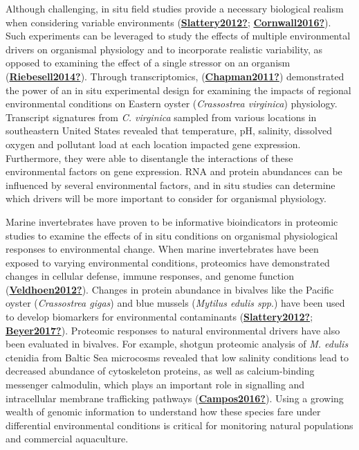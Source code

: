 \documentclass [11pt, proquest] {uwthesis}[2015/03/03]
\begin{document}
Although challenging, in situ field studies provide a necessary biological realism when considering variable environments (\protect\hyperlink{ref-Slattery2012}{\textbf{Slattery2012?}}; \protect\hyperlink{ref-Cornwall2016}{\textbf{Cornwall2016?}}). Such experiments can be leveraged to study the effects of multiple environmental drivers on organismal physiology and to incorporate realistic variability, as opposed to examining the effect of a single stressor on an organism (\protect\hyperlink{ref-Riebesell2014}{\textbf{Riebesell2014?}}). Through transcriptomics, (\protect\hyperlink{ref-Chapman2011}{\textbf{Chapman2011?}}) demonstrated the power of an in situ experimental design for examining the impacts of regional environmental conditions on Eastern oyster (\emph{Crassostrea virginica}) physiology. Transcript signatures from \emph{C. virginica} sampled from various locations in southeastern United States revealed that temperature, pH, salinity, dissolved oxygen and pollutant load at each location impacted gene expression. Furthermore, they were able to disentangle the interactions of these environmental factors on gene expression. RNA and protein abundances can be influenced by several environmental factors, and in situ studies can determine which drivers will be more important to consider for organismal physiology.

Marine invertebrates have proven to be informative bioindicators in proteomic studies to examine the effects of in situ conditions on organismal physiological responses to environmental change. When marine invertebrates have been exposed to varying environmental conditions, proteomics have demonstrated changes in cellular defense, immune responses, and genome function (\protect\hyperlink{ref-Veldhoen2012}{\textbf{Veldhoen2012?}}). Changes in protein abundance in bivalves like the Pacific oyster (\emph{Crassostrea gigas}) and blue mussels (\emph{Mytilus edulis spp}.) have been used to develop biomarkers for environmental contaminants (\protect\hyperlink{ref-Slattery2012}{\textbf{Slattery2012?}}; \protect\hyperlink{ref-Beyer2017}{\textbf{Beyer2017?}}). Proteomic responses to natural environmental drivers have also been evaluated in bivalves. For example, shotgun proteomic analysis of \emph{M. edulis} ctenidia from Baltic Sea microcosms revealed that low salinity conditions lead to decreased abundance of cytoskeleton proteins, as well as calcium-binding messenger calmodulin, which plays an important role in signalling and intracellular membrane trafficking pathways (\protect\hyperlink{ref-Campos2016}{\textbf{Campos2016?}}). Using a growing wealth of genomic information to understand how these species fare under differential environmental conditions is critical for monitoring natural populations and commercial aquaculture.
\end{document}
